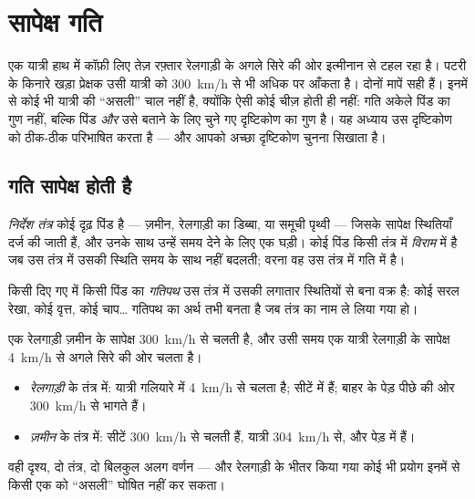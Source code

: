 \chapter{सापेक्ष गति}\label{ch:g10:relative-motion}

एक यात्री हाथ में कॉफ़ी लिए तेज़ रफ़्तार रेलगाड़ी के अगले सिरे की ओर
इत्मीनान से टहल रहा है। पटरी के किनारे खड़ा प्रेक्षक उसी यात्री को
\qty{300}{km/h} से भी अधिक पर आँकता है। दोनों मापें सही हैं। इनमें से कोई भी
यात्री की ``असली'' चाल नहीं है, क्योंकि ऐसी कोई चीज़ होती ही नहीं: गति
अकेले पिंड का गुण नहीं, बल्कि पिंड \emph{और} उसे बताने के लिए चुने गए
दृष्टिकोण का गुण है। यह अध्याय उस दृष्टिकोण को ठीक-ठीक परिभाषित करता है
--- और आपको अच्छा दृष्टिकोण चुनना सिखाता है।

\section{गति सापेक्ष होती है}

\begin{definition}[निर्देश तंत्र]\label{def:g10:relative-motion:frame}
\emph{निर्देश तंत्र} कोई दृढ़ पिंड है --- ज़मीन,
रेलगाड़ी का डिब्बा, या समूची पृथ्वी --- जिसके सापेक्ष स्थितियाँ दर्ज की
जाती हैं, और उनके साथ उन्हें समय देने के लिए एक घड़ी। कोई पिंड किसी तंत्र
में \emph{विराम} में है जब उस तंत्र में उसकी स्थिति समय के
साथ नहीं बदलती; वरना वह उस तंत्र में गति में है।
\end{definition}

\begin{definition}[गतिपथ]\label{def:g10:relative-motion:trajectory}
किसी दिए गए  में किसी पिंड का
\emph{गतिपथ} उस तंत्र में उसकी लगातार स्थितियों से बना वक्र
है: कोई सरल रेखा, कोई वृत्त, कोई चाप\dots{} गतिपथ का अर्थ तभी बनता है जब
तंत्र का नाम ले लिया गया हो।
\end{definition}

\begin{example}[रेलगाड़ी में टहलता यात्री]\label{ex:g10:relative-motion:walker}
एक रेलगाड़ी ज़मीन के सापेक्ष \qty{300}{km/h} से चलती है, और उसी समय एक यात्री
रेलगाड़ी के सापेक्ष \qty{4}{km/h} से अगले सिरे की ओर चलता है।
\begin{itemize}
  \item \emph{रेलगाड़ी} के तंत्र में: यात्री गलियारे में \qty{4}{km/h} से चलता
        है; सीटें  में हैं; बाहर के पेड़ पीछे की ओर \qty{300}{km/h}
        से भागते हैं।
  \item \emph{ज़मीन} के तंत्र में: सीटें \qty{300}{km/h} से चलती हैं, यात्री
        \qty{304}{km/h} से, और पेड़  में हैं।
\end{itemize}
वही दृश्य, दो तंत्र, दो बिलकुल अलग वर्णन --- और रेलगाड़ी के भीतर किया
गया कोई भी प्रयोग इनमें से किसी एक को ``असली'' घोषित नहीं कर सकता।
\end{example}

